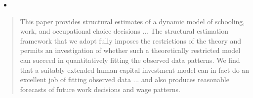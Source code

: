 \begin{frame}
\begin{itemize}
\item {}
\end{itemize}
\end{frame}
\begin{frame}\begin{quote}
This paper provides structural estimates of a dynamic model of schooling, work, and occupational choice decisions ... The structural estimation framework that we adopt fully imposes the restrictions of the theory and permits an investigation of whether such a theoretically restricted model can succeed in quantitatively fitting the observed data patterns. We find that a suitably extended human capital investment model can in fact do an excellent job of fitting observed data ... and also produces reasonable forecasts of future work decisions and wage patterns.
\end{quote}\end{frame}

